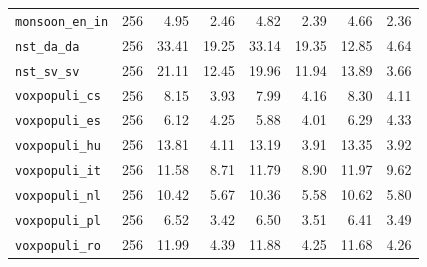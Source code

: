 \begin{table}[!ht]
\begin{tabular}{lrrrrrrr}
\texttt{monsoon\_en\_in} & 256 & 4.95 & 2.46 & 4.82 & 2.39 & 4.66 & 2.36\\
\texttt{nst\_da\_da} & 256 & 33.41 & 19.25 & 33.14 & 19.35 & 12.85 & 4.64\\
\texttt{nst\_sv\_sv} & 256 & 21.11 & 12.45 & 19.96 & 11.94 & 13.89 & 3.66\\
\texttt{voxpopuli\_cs} & 256 & 8.15 & 3.93 & 7.99 & 4.16 & 8.30 & 4.11\\
\texttt{voxpopuli\_es} & 256 & 6.12 & 4.25 & 5.88 & 4.01 & 6.29 & 4.33\\
\texttt{voxpopuli\_hu} & 256 & 13.81 & 4.11 & 13.19 & 3.91 & 13.35 & 3.92\\
\texttt{voxpopuli\_it} & 256 & 11.58 & 8.71 & 11.79 & 8.90 & 11.97 & 9.62\\
\texttt{voxpopuli\_nl} & 256 & 10.42 & 5.67 & 10.36 & 5.58 & 10.62 & 5.80\\
\texttt{voxpopuli\_pl} & 256 & 6.52 & 3.42 & 6.50 & 3.51 & 6.41 & 3.49\\
\texttt{voxpopuli\_ro} & 256 & 11.99 & 4.39 & 11.88 & 4.25 & 11.68 & 4.26\\
\bottomrule
\end{tabular}
\end{table}

